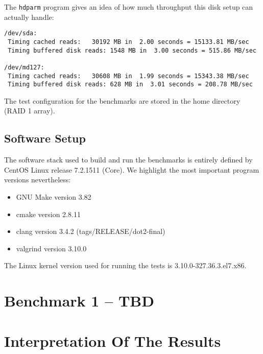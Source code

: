 The \texttt{hdparm} program gives an idea of how much throughput this disk setup can actually handle:

\begin{lstlisting}[caption={Disk performance on the benchmark machine}]
/dev/sda:
 Timing cached reads:   30192 MB in  2.00 seconds = 15133.81 MB/sec
 Timing buffered disk reads: 1548 MB in  3.00 seconds = 515.86 MB/sec

/dev/md127:
 Timing cached reads:   30608 MB in  1.99 seconds = 15343.38 MB/sec
 Timing buffered disk reads: 628 MB in  3.01 seconds = 208.78 MB/sec
\end{lstlisting}

The test configuration for the benchmarks are stored in the home directory (RAID 1 array).

  \subsection{Software Setup}

The software stack used to build and run the benchmarks is entirely defined by CentOS Linux release 7.2.1511 (Core).
We highlight the most important program versions nevertheless:

\begin{itemize}
  \item GNU Make version 3.82
  \item cmake version 2.8.11
  \item clang version 3.4.2 (tags/RELEASE/dot2-final)
  \item valgrind version 3.10.0
\end{itemize}

The Linux kernel version used for running the tests is 3.10.0-327.36.3.el7.x86.

\section{Benchmark 1 -- TBD}

\section{Interpretation Of The Results}

